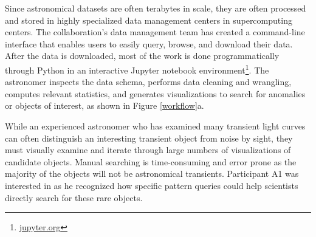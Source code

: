  Since astronomical datasets are often terabytes in scale, they are often processed and stored in highly specialized data management centers in supercomputing centers. The collaboration's data management team has created a command-line interface that enables users to easily query, browse, and download their data. 
After the data is downloaded, most of the work is done programmatically through Python in an interactive Jupyter notebook environment\footnote{\url{jupyter.org}}. The astronomer inspects the data schema, performs data cleaning and wrangling, computes relevant statistics, and generates visualizations to search for anomalies or objects of interest, as shown in Figure \ref{workflow}a.
\par While an experienced astronomer who has examined many transient light curves can often distinguish an interesting transient object from noise by sight, they must visually examine and iterate through large numbers of visualizations of candidate objects. Manual searching is time-consuming and error prone as the majority of the objects will not be astronomical transients.
Participant A1 was interested in \zv as he recognized how specific pattern queries could help scientists directly search for these rare objects. 

